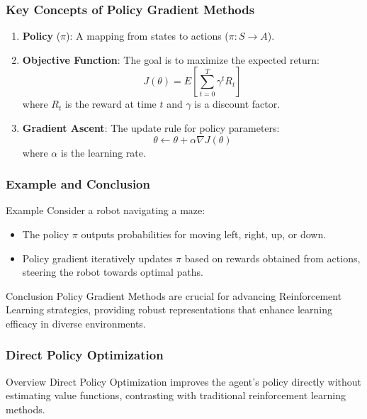 \documentclass[aspectratio=169]{beamer}
\begin{document}
\begin{frame}[fragile]
    \frametitle{Key Concepts of Policy Gradient Methods}
    \begin{enumerate}
        \item \textbf{Policy } (\(\pi\)): A mapping from states to actions (\(\pi: S \rightarrow A\)).
        \item \textbf{Objective Function}: The goal is to maximize the expected return:
        \begin{equation}
            J(\theta) = E\left[\sum_{t=0}^{T} \gamma^t R_t\right]
        \end{equation}
        where \(R_t\) is the reward at time \(t\) and \(\gamma\) is a discount factor.
        \item \textbf{Gradient Ascent}: The update rule for policy parameters:
        \begin{equation}
            \theta \leftarrow \theta + \alpha \nabla J(\theta)
        \end{equation}
        where \(\alpha\) is the learning rate.
    \end{enumerate}
\end{frame}

\begin{frame}[fragile]
    \frametitle{Example and Conclusion}
    \begin{block}{Example}
        Consider a robot navigating a maze:
        \begin{itemize}
            \item The policy \(\pi\) outputs probabilities for moving left, right, up, or down.
            \item Policy gradient iteratively updates \(\pi\) based on rewards obtained from actions, steering the robot towards optimal paths.
        \end{itemize}
    \end{block}
    \begin{block}{Conclusion}
        Policy Gradient Methods are crucial for advancing Reinforcement Learning strategies, providing robust representations that enhance learning efficacy in diverse environments.
    \end{block}
\end{frame}

\begin{frame}[fragile]
    \frametitle{Direct Policy Optimization}
    \begin{block}{Overview}
        Direct Policy Optimization improves the agent's policy directly without estimating value functions, contrasting with traditional reinforcement learning methods.
    \end{block}
\end{frame}
\end{document}
